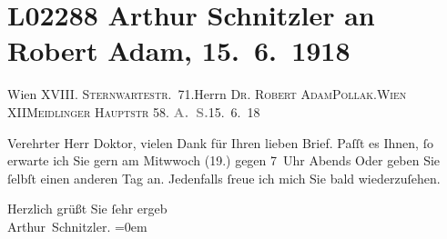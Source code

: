 

\section[Arthur Schnitzler an Robert Adam, 15. 6. 1918]{L02288 Arthur Schnitzler an Robert Adam, 15. 6. 1918}
\nopagebreak{}
\rehead{ }\normalsize\beginnumbering{}
\toendnotes[C]{\smallbreak\pagebreak[2]}
\pstart{}{\pb}Wien XVIII. \textsc{Sternwartestr}. 71.\pend{}{\bigskip}\pstart{}Herrn \textsc{Dr. Robert Adam}\pend{}\pstart{}\textsc{Pollak}.\pend{}\pstart{}\textsc{Wien} XII\pend{}\pstart{}\textsc{Meidlinger Hauptstr} 58.\pend{}{\bigskip}\vspace{1em}
\pstart
           {\pb}\textcolor{gray}{\textbf{A. S.}}\hfill 15. 6. 18\pend
           
\pstart{}Verehrter Herr Doktor, \pend\vspace{0.5em}
\pstart
           vielen Dank für Ihren lieben Brief. Paſſt es Ihnen, ſo erwarte ich Sie gern am
                  Mitwwoch (19.) gegen 7 Uhr Abends Oder geben Sie ſelbſt
               einen anderen Tag an. Jedenfalls ſreue ich mich Sie bald wiederzuſehen.\pend
           
\pstart
           Herzlich grüßt Sie ſehr ergeb{\\[\baselineskip]}\spacefill\mbox{Arthur Schnitzler.}\pend
           \leftskip=0em{}\endnumbering{}  
      